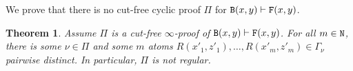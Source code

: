 \documentclass[a4paper,12pt]{article}
\newtheorem{theorem}{Theorem}[section]
\newtheorem{lemma}[theorem]{Lemma}
\newenvironment{proof}[1][Proof]{\begin{trivlist}
\item[\hskip \labelsep {\bfseries #1}]}{\end{trivlist}}
\newcommand{\Nat}               { {\tt N}  }
\newcommand{\Backward}         { {\tt B} }
\newcommand{\Forward}         { {\tt F} }
\newcommand{\range}           { {\tt range} }
\begin{document}
%
%

We prove that there is no cut-free cyclic proof $\Pi$ for $\Backward(x,y) \vdash \Forward(x,y)$.

\begin{theorem}
Assume $\Pi$ is a cut-free $\infty$-proof of $\Backward(x,y) \vdash \Forward(x,y)$. For all $m \in \Nat$, there is some $\nu \in \Pi$ and some $m$ atoms $R(x'_1,z'_1), \ldots, R(x'_{m},z'_{m}) \in \Gamma_\nu$ pairwise distinct. In particular, $\Pi$ is not regular.
\end{theorem}
\end{document}
